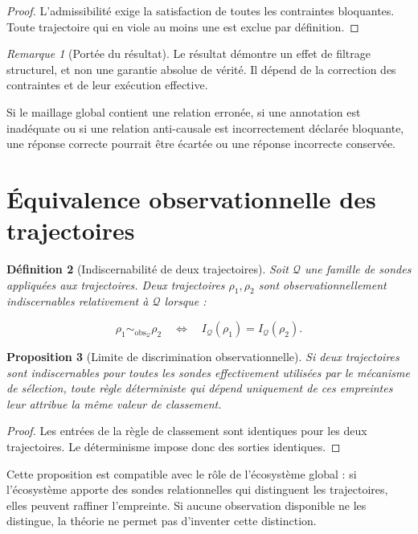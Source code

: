 \documentclass[11pt,a4paper,oneside]{book}
\newtheorem{definition}{Définition}[chapter]
\newtheorem{proposition}[definition]{Proposition}
\theoremstyle{remark}
\newtheorem{remarque}[definition]{Remarque}
\newcommand{\ObsRel}{\sim_{\mathrm{obs}}}
\begin{document}
\begin{proof}
L'admissibilité exige la satisfaction de toutes les contraintes
bloquantes. Toute trajectoire qui en viole au moins une est exclue
par définition.
\end{proof}

\begin{remarque}[Portée du résultat]
Le résultat démontre un effet de filtrage structurel, et non une
garantie absolue de vérité. Il dépend de la correction des contraintes
et de leur exécution effective.

Si le maillage global contient une relation erronée, si une
annotation est inadéquate ou si une relation anti-causale est
incorrectement déclarée bloquante, une réponse correcte pourrait
être écartée ou une réponse incorrecte conservée.
\end{remarque}

\section{Équivalence observationnelle des trajectoires}

\begin{definition}[Indiscernabilité de deux trajectoires]
Soit \(\mathcal{Q}\) une famille de sondes appliquées aux trajectoires.
Deux trajectoires \(\rho_1,\rho_2\) sont observationnellement
indiscernables relativement à \(\mathcal{Q}\) lorsque :

\[
\rho_1\ObsRel_{\mathcal{Q}}\rho_2
\quad\Longleftrightarrow\quad
I_{\mathcal{Q}}(\rho_1)=I_{\mathcal{Q}}(\rho_2).
\]
\end{definition}

\begin{proposition}[Limite de discrimination observationnelle]
Si deux trajectoires sont indiscernables pour toutes les sondes
effectivement utilisées par le mécanisme de sélection, toute règle
déterministe qui dépend uniquement de ces empreintes leur attribue
la même valeur de classement.

\end{proposition}

\begin{proof}
Les entrées de la règle de classement sont identiques pour les deux
trajectoires. Le déterminisme impose donc des sorties identiques.
\end{proof}

Cette proposition est compatible avec le rôle de l'écosystème
global : si l'écosystème apporte des sondes relationnelles qui
distinguent les trajectoires, elles peuvent raffiner l'empreinte.
Si aucune observation disponible ne les distingue, la théorie
ne permet pas d'inventer cette distinction.
\end{document}
